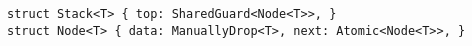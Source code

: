 \begin{lstlisting}
struct Stack<T> { top: SharedGuard<Node<T>>, }
struct Node<T> { data: ManuallyDrop<T>, next: Atomic<Node<T>>, }
\end{lstlisting}
